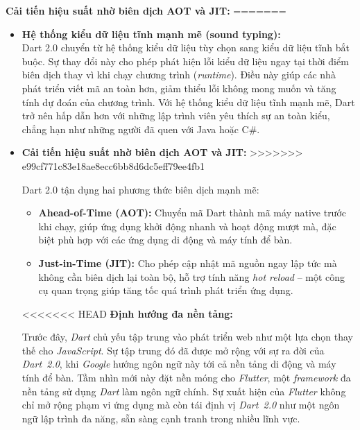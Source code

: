 \documentclass[../DoAn.tex]{subfiles}
\numberwithin{figure}{chapter}
\begin{document}
    \textbf{Cải tiến hiệu suất nhờ biên dịch AOT và JIT:} 
=======
\begin{itemize}
    \item \textbf{Hệ thống kiểu dữ liệu tĩnh mạnh mẽ (sound typing):}  \\[0.5em]
    Dart 2.0 chuyển từ hệ thống kiểu dữ liệu tùy chọn sang kiểu dữ liệu tĩnh bắt buộc. Sự thay đổi này cho phép phát hiện lỗi kiểu dữ liệu ngay tại thời điểm biên dịch thay vì khi chạy chương trình (\textit{runtime}). Điều này giúp các nhà phát triển viết mã an toàn hơn, giảm thiểu lỗi không mong muốn và tăng tính dự đoán của chương trình. Với hệ thống kiểu dữ liệu tĩnh mạnh mẽ, Dart trở nên hấp dẫn hơn với những lập trình viên yêu thích sự an toàn kiểu, chẳng hạn như những người đã quen với Java hoặc C\#.

    \item \textbf{Cải tiến hiệu suất nhờ biên dịch AOT và JIT:} 
>>>>>>> e99cf771c83e18ae8ecc6bb8d6dc5eff79ee4fb1
    
    Dart 2.0 tận dụng hai phương thức biên dịch mạnh mẽ:

    \begin{itemize}
        \item \textbf{Ahead-of-Time (AOT):} Chuyển mã Dart thành mã máy native trước khi chạy, giúp ứng dụng khởi động nhanh và hoạt động mượt mà, đặc biệt phù hợp với các ứng dụng di động và máy tính để bàn.
        \item \textbf{Just-in-Time (JIT):} Cho phép cập nhật mã nguồn ngay lập tức mà không cần biên dịch lại toàn bộ, hỗ trợ tính năng \textit{hot reload} – một công cụ quan trọng giúp tăng tốc quá trình phát triển ứng dụng.
    \end{itemize}

<<<<<<< HEAD
    \textbf{Định hướng đa nền tảng:} 
    
 Trước đây, \textit{Dart} chủ yếu tập trung vào phát triển web như một lựa chọn thay thế cho \textit{JavaScript}. Sự tập trung đó đã được mở rộng với sự ra đời của \textit{Dart~2.0}, khi \textit{Google} hướng ngôn ngữ này tới cả nền tảng di động và máy tính để bàn. Tầm nhìn mới này đặt nền móng cho \textit{Flutter}, một \textit{framework} đa nền tảng sử dụng \textit{Dart} làm ngôn ngữ chính. Sự xuất hiện của \textit{Flutter} không chỉ mở rộng phạm vi ứng dụng mà còn tái định vị \textit{Dart~2.0} như một ngôn ngữ lập trình đa năng, sẵn sàng cạnh tranh trong nhiều lĩnh vực.










\end{itemize}
\end{document}
